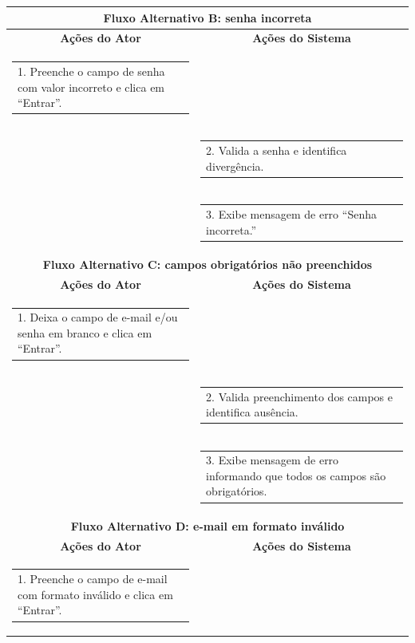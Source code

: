 \begin{longtable}[c]{|p{}|p{}|}
\multicolumn{2}{|c|}{\textbf{Fluxo Alternativo B: senha incorreta}} \\ \hline
\multicolumn{1}{|c|}{\textbf{Ações do Ator}} &
  \multicolumn{1}{c|}{\textbf{Ações do Sistema}} \\ \hline
\multicolumn{1}{|p{0.48\textwidth}|}{\begin{tabular}[c]{@{}p{}@{}}1. Preenche o campo de senha com valor incorreto e clica em ``Entrar''.\end{tabular}} &
   \\ \hline
\multicolumn{1}{|p{0.48\textwidth}|}{} &
  \begin{tabular}[c]{@{}p{}@{}}2. Valida a senha e identifica divergência.\end{tabular} \\ \hline
\multicolumn{1}{|p{0.48\textwidth}|}{} &
  \begin{tabular}[c]{@{}p{}@{}}3. Exibe mensagem de erro ``Senha incorreta.''\end{tabular} \\ \hline
\multicolumn{2}{|c|}{\textbf{Fluxo Alternativo C: campos obrigatórios não preenchidos}} \\ \hline
\multicolumn{1}{|c|}{\textbf{Ações do Ator}} &
  \multicolumn{1}{c|}{\textbf{Ações do Sistema}} \\ \hline
\multicolumn{1}{|p{0.48\textwidth}|}{\begin{tabular}[c]{@{}p{}@{}}1. Deixa o campo de e-mail e/ou senha em branco e clica em ``Entrar''.\end{tabular}} &
   \\ \hline
\multicolumn{1}{|p{0.48\textwidth}|}{} &
  \begin{tabular}[c]{@{}p{}@{}}2. Valida preenchimento dos campos e identifica ausência.\end{tabular} \\ \hline
\multicolumn{1}{|p{0.48\textwidth}|}{} &
  \begin{tabular}[c]{@{}p{}@{}}3. Exibe mensagem de erro informando que todos os campos são obrigatórios.\end{tabular} \\ \hline
\multicolumn{2}{|c|}{\textbf{Fluxo Alternativo D: e-mail em formato inválido}} \\ \hline
\multicolumn{1}{|c|}{\textbf{Ações do Ator}} &
  \multicolumn{1}{c|}{\textbf{Ações do Sistema}} \\ \hline
\multicolumn{1}{|p{0.48\textwidth}|}{\begin{tabular}[c]{@{}p{}@{}}1. Preenche o campo de e-mail com formato inválido e clica em ``Entrar''.\end{tabular}} &

\end{longtable}
